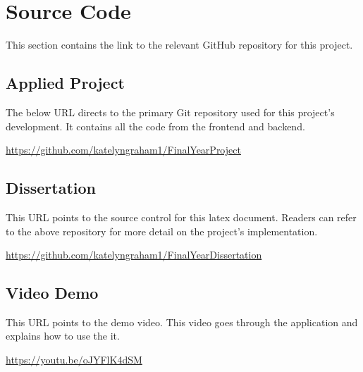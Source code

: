 \section{Source Code}
This section contains the link to the relevant GitHub repository for this project. 

\subsection{Applied Project}

The below URL directs to the primary Git repository used for this project’s development. It contains all the code from the frontend and backend.

\href{https://github.com/katelyngraham1/Final_Year_Project}{https://github.com/katelyngraham1/Final\textunderscore Year\textunderscore Project} 


\subsection{Dissertation} 
This URL points to the source control for this latex document. Readers can refer to the above repository for more detail on the project’s implementation.

\href{https://github.com/katelyngraham1/Final_Year_Dissertation}
{https://github.com/katelyngraham1/Final\textunderscore Year\textunderscore Dissertation}



\subsection{Video Demo}
This URL points to the demo video. This video goes through the application and explains how to use the it.

\href{https://youtu.be/oJY_FlK4dSM}
{https://youtu.be/oJY\textunderscore FlK4dSM}




